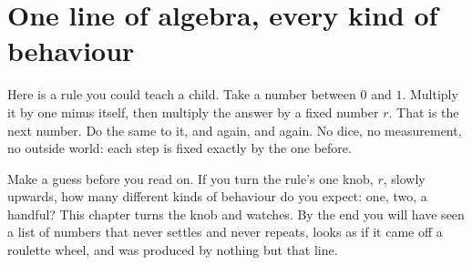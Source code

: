 
\chapter{One line of algebra, every kind of behaviour}
\label{ch:logistic}

\noindent
Here is a rule you could teach a child. Take a number between $0$ and $1$.
Multiply it by one minus itself, then multiply the answer by a fixed number
$r$. That is the next number. Do the same to it, and again, and again. No
dice, no measurement, no outside world: each step is fixed exactly by the
one before.

Make a guess before you read on. If you turn the rule's one knob, $r$,
slowly upwards, how many different kinds of behaviour do you expect: one,
two, a handful? This chapter turns the knob and watches. By the end you will
have seen a list of numbers that never settles and never repeats, looks as
if it came off a roulette wheel, and was produced by nothing but that line.

\begin{outcomes}
\end{outcomes}

